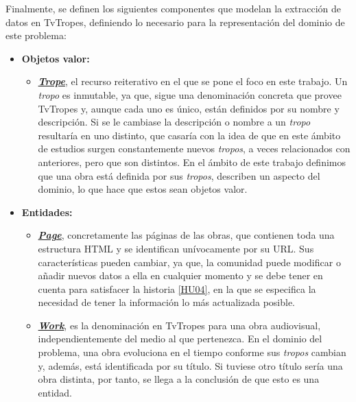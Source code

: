 Finalmente, se definen los siguientes componentes que modelan la extracción de
datos en TvTropes, definiendo lo necesario para la representación del dominio de
este problema:
\begin{itemize}
  \item \textbf{Objetos valor:}
  \begin{itemize}
    \item
    \textbf{\href{https://github.com/jlgallego99/TropesToGo/blob/master/tropestogo/trope.go}{\textit{Trope}}},
    el recurso reiterativo en el que se pone el foco en este trabajo. Un
    \textit{tropo} es inmutable, ya que, sigue una denominación concreta que
    provee TvTropes y, aunque cada uno es único, están definidos por su nombre y
    descripción. Si se le cambiase la descripción o nombre a un \textit{tropo}
    resultaría en uno distinto, que casaría con la idea de que en este ámbito de
    estudios surgen constantemente nuevos \textit{tropos}, a veces relacionados
    con anteriores, pero que son distintos. En el ámbito de este trabajo
    definimos que una obra está definida por sus \textit{tropos}, describen un
    aspecto del dominio, lo que hace que estos sean objetos valor. 
  \end{itemize}
  \item \textbf{Entidades:}
  \begin{itemize}
    \item
    \textbf{\href{https://github.com/jlgallego99/TropesToGo/blob/master/tropestogo/page.go}{\textit{Page}}},
    concretamente las páginas de las obras, que contienen toda una estructura
    HTML y se identifican unívocamente por su URL. Sus características pueden
    cambiar, ya que, la comunidad puede modificar o añadir nuevos datos a ella
    en cualquier momento y se debe tener en cuenta para satisfacer la historia
    \href{https://github.com/jlgallego99/TropesToGo/issues/9}{[HU04]}, en la que
    se especifica la necesidad de tener la información lo más actualizada
    posible.
    \item
    \textbf{\href{https://github.com/jlgallego99/TropesToGo/blob/master/tropestogo/work.go}{\textit{Work}}},
    es la denominación en TvTropes para una obra audiovisual, independientemente
    del medio al que pertenezca. En el dominio del problema, una obra evoluciona
    en el tiempo conforme sus \textit{tropos} cambian y, además, está
    identificada por su título. Si tuviese otro título sería una obra distinta,
    por tanto, se llega a la conclusión de que esto es una entidad.
  \end{itemize}

\end{itemize}

